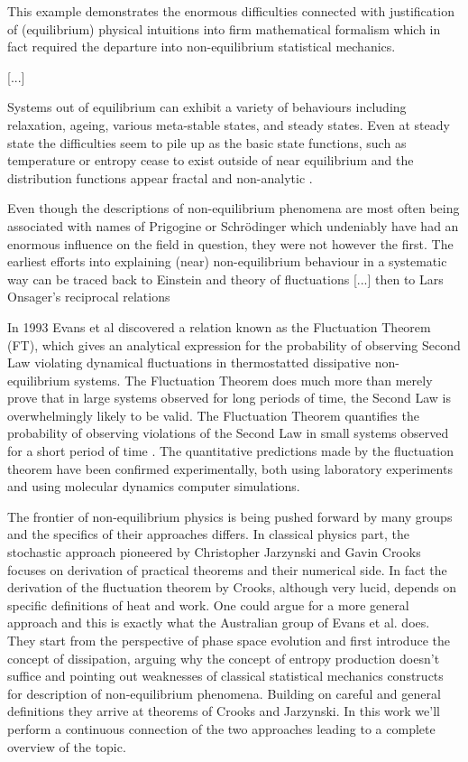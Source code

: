 \documentclass[a4paper,12pt,nofootinbib]{article}
\begin{document}
This example demonstrates the enormous difficulties connected with justification of (equilibrium) physical intuitions into firm mathematical formalism which in fact required the departure into non-equilibrium statistical mechanics.

[...]

Systems out of equilibrium can exhibit a variety of behaviours including relaxation, ageing, various meta-stable states, and steady states.
Even at steady state the difficulties seem to pile up as the basic state functions, such as temperature or entropy cease to exist outside of near equilibrium and the distribution functions appear fractal and non-analytic \cite{Dewar:2014ek}.

Even though the descriptions of non-equilibrium phenomena are most often being associated with names of Prigogine or Schr{\" o}dinger which undeniably have had an enormous influence on the field in question, they were not however the first.
The earliest efforts into explaining (near) non-equilibrium behaviour in a systematic way can be traced back to Einstein and theory of fluctuations [...] then to Lars Onsager's reciprocal relations


In 1993 Evans et al discovered a relation known as the Fluctuation Theorem (FT), which gives an analytical expression for the probability of observing Second Law violating dynamical fluctuations in thermostatted dissipative non-equilibrium systems.
The Fluctuation Theorem does much more than merely prove that in large systems observed for long periods of time, the Second Law is overwhelmingly likely to be valid. The Fluctuation Theorem quantifies the probability of observing violations of the Second Law in small systems observed for a short period of time \cite{Evans:2002gy}. The quantitative predictions made by the fluctuation theorem have been confirmed experimentally, both using laboratory experiments and using molecular dynamics computer simulations.

The frontier of non-equilibrium physics is being pushed forward by many groups and the specifics of their approaches differs. 
In classical physics part, the stochastic approach pioneered by Christopher Jarzynski and Gavin Crooks focuses on derivation of practical theorems and their numerical side. In fact the derivation of the fluctuation theorem by Crooks, although very lucid, depends on specific definitions of heat and work. One could argue for a more general approach and this is exactly what the Australian group of Evans et al. does. They start from the perspective of phase space evolution and first introduce the concept of dissipation, arguing why the concept of entropy production doesn't suffice and pointing out weaknesses of classical statistical mechanics constructs for description of non-equilibrium phenomena. Building on careful and general definitions they arrive at theorems of Crooks and Jarzynski. In this work we'll perform a continuous connection of the two approaches leading to a complete overview of the topic.
\end{document}
